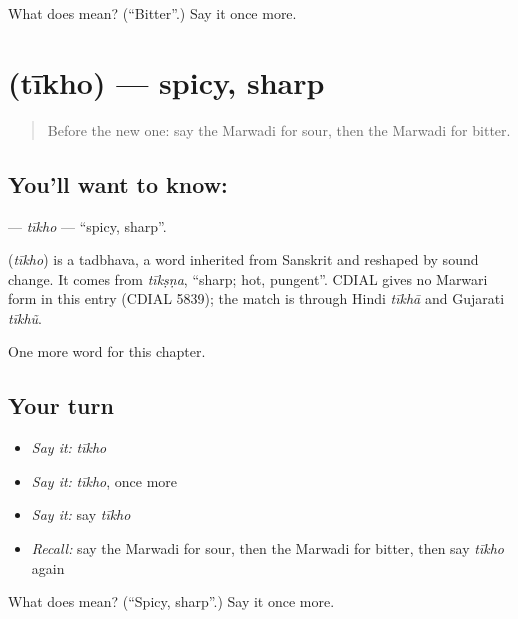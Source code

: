 \begin{tcolorbox}[breakable,colback=teal!4,colframe=teal!35!black,title={Before you move on}]
What does  mean? (\textquotedblleft{}Bitter\textquotedblright{}.) Say it once more.
\end{tcolorbox}
\section[\texorpdfstring{\mw{तीखो} (tīkho)}{तीखो (tīkho)}]{ (tīkho) — spicy, sharp}

\label{lesson:MW-C143-tikho}



\begin{quote}
Before the new one: say the Marwadi for sour, then the Marwadi for bitter.
\end{quote}

\subsection*{You'll want to know: }
\textbf{} — \emph{tīkho} — \textquotedblleft{}spicy, sharp\textquotedblright{}.

\begin{cousinweb}
\textbf{} (\emph{tīkho}) is a tadbhava, a word inherited from Sanskrit and reshaped by sound change. It comes from \emph{tīkṣṇa}, \textquotedblleft{}sharp; hot, pungent\textquotedblright{}. CDIAL gives no Marwari form in this entry (CDIAL 5839); the match is through Hindi \emph{tīkhā} and Gujarati \emph{tīkhũ}.
\end{cousinweb}

\begin{grammarlens}[title={What you've built}]
One more word for this chapter.
\end{grammarlens}

\subsection*{Your turn}
\begin{itemize}
\raggedright
  \item \emph{Say it:} \emph{tīkho}
  \item \emph{Say it:} \emph{tīkho}, once more
  \item \emph{Say it:} say \emph{tīkho}
  \item \emph{Recall:} say the Marwadi for sour, then the Marwadi for bitter, then say \emph{tīkho} again
\end{itemize}

\begin{tcolorbox}[breakable,colback=teal!4,colframe=teal!35!black,title={Before you move on}]
What does  mean? (\textquotedblleft{}Spicy, sharp\textquotedblright{}.) Say it once more.
\end{tcolorbox}
